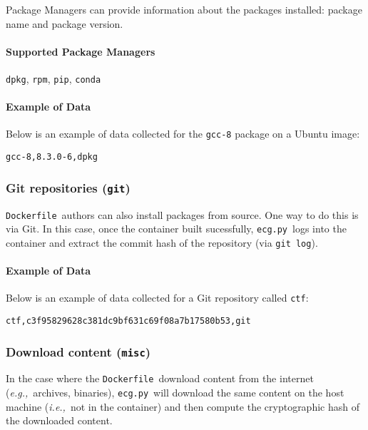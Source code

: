 \documentclass{article}
\newcommand{\dfile}{\texttt{Dockerfile}}
\newcommand{\ecg}{\texttt{ecg.py}}
\newcommand{\eg}{\emph{e.g.,}}
\newcommand{\ie}{\emph{i.e.,}}
\begin{document}
Package Managers can provide information about the packages installed: package name and package version.

\paragraph{Supported Package Managers} \texttt{dpkg}, \texttt{rpm}, \texttt{pip}, \texttt{conda}

\paragraph{Example of Data}

Below is an example of data collected for the \texttt{gcc-8} package on a Ubuntu image:

\begin{lstlisting}
gcc-8,8.3.0-6,dpkg
\end{lstlisting}

\subsubsection{Git repositories (\texttt{git})}\label{sec:git}

\dfile\ authors can also install packages from source.
One way to do this is via Git.
In this case, once the container built sucessfully, \ecg\ logs into the container and extract the commit hash of the repository (via \texttt{git log}).

\paragraph{Example of Data}

Below is an example of data collected for a Git repository called \texttt{ctf}:

\begin{lstlisting}
ctf,c3f95829628c381dc9bf631c69f08a7b17580b53,git
\end{lstlisting}

\subsubsection{Download content (\texttt{misc})}\label{sec:misc}

In the case where the \dfile\ download content from the internet (\eg\ archives, binaries), \ecg\ will download the same content on the host machine (\ie\ not in the container) and then compute the cryptographic hash of the downloaded content.
\end{document}
